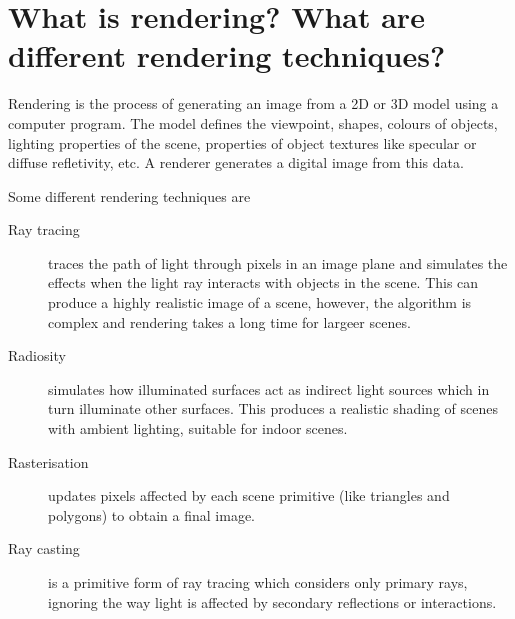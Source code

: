 \section{What is rendering? What are different rendering techniques?}

Rendering is the process of generating an image from a 2D or 3D model using a
computer program. The model defines the viewpoint, shapes, colours of objects,
lighting properties of the scene, properties of object textures like specular or
diffuse refletivity, etc. A renderer generates a digital image from this data.

Some different rendering techniques are
\begin{description}
  \item [Ray tracing]traces the path of light through pixels in an image plane
    and simulates the effects when the light ray interacts with objects in the
    scene. This can produce a highly realistic image of a scene, however, the
    algorithm is complex and rendering takes a long time for largeer scenes.
  \item [Radiosity] simulates how illuminated surfaces act as indirect light
    sources which in turn illuminate other surfaces. This produces a realistic
    shading of scenes with ambient lighting, suitable for indoor scenes.
  \item [Rasterisation] updates pixels affected by each scene primitive (like
    triangles and polygons) to obtain a final image.
  \item [Ray casting] is a primitive form of ray tracing which considers only
    primary rays, ignoring the way light is affected by secondary reflections or
    interactions.
\end{description}
